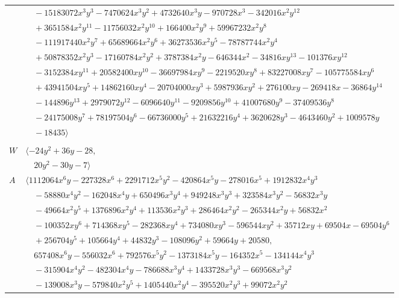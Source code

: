 \documentclass[11pt]{article}
\begin{document}
\begin{longtable}{@{}ll@{}}
 & $\quad -15183072x^{3}y^{3}-7470624x^{3}y^{2}+4732640x^{3}y-970728x^{3}-342016x^{2}y^{12}$\\
 & $\quad +3651584x^{2}y^{11}-11756032x^{2}y^{10}+166400x^{2}y^{9}+59967232x^{2}y^{8}$\\
 & $\quad -111917440x^{2}y^{7}+65689664x^{2}y^{6}+36273536x^{2}y^{5}-78787744x^{2}y^{4}$\\
 & $\quad +50878352x^{2}y^{3}-17160784x^{2}y^{2}+3787384x^{2}y-646344x^{2}-34816xy^{13}-101376xy^{12}$\\
 & $\quad -3152384xy^{11}+20582400xy^{10}-36697984xy^{9}-2219520xy^{8}+83227008xy^{7}-105775584xy^{6}$\\
 & $\quad +43941504xy^{5}+14862160xy^{4}-20704000xy^{3}+5987936xy^{2}+276100xy-269418x-36864y^{14}$\\
 & $\quad -144896y^{13}+2979072y^{12}-6096640y^{11}-9209856y^{10}+41007680y^{9}-37409536y^{8}$\\
 & $\quad -24175008y^{7}+78197504y^{6}-66736000y^{5}+21632216y^{4}+3620628y^{3}-4643460y^{2}+1009578y$\\
 & $\quad -18435\rangle$\\
\addlinespace[2pt]
\multicolumn{2}{@{}p{0.97\textwidth}@{}}{$i=41$, $D_i=4$, $\rho_{ij}$: $4{:}2, \allowbreak 5{:}1, \allowbreak 17{:}2, \allowbreak 18{:}1, \allowbreak 43{:}1, \allowbreak 45{:}1, \allowbreak 49{:}1$}\\
$W$ & $\langle -24y^{2}+36y-28,$\\
 & $\quad 20y^{2}-30y-7\rangle$\\
$A$ & $\langle 1112064x^{6}y-227328x^{6}+2291712x^{5}y^{2}-420864x^{5}y-278016x^{5}+1912832x^{4}y^{3}$\\
 & $\quad -58880x^{4}y^{2}-162048x^{4}y+650496x^{3}y^{4}+949248x^{3}y^{3}+323584x^{3}y^{2}-56832x^{3}y$\\
 & $\quad -49664x^{2}y^{5}+1376896x^{2}y^{4}+113536x^{2}y^{3}+286464x^{2}y^{2}-265344x^{2}y+56832x^{2}$\\
 & $\quad -100352xy^{6}+714368xy^{5}-282368xy^{4}+734080xy^{3}-596544xy^{2}+35712xy+69504x-69504y^{6}$\\
 & $\quad +256704y^{5}+105664y^{4}+44832y^{3}-108096y^{2}+59664y+20580,$\\
 & $\quad 657408x^{6}y-556032x^{6}+792576x^{5}y^{2}-1373184x^{5}y-164352x^{5}-134144x^{4}y^{3}$\\
 & $\quad -315904x^{4}y^{2}-482304x^{4}y-786688x^{3}y^{4}+1433728x^{3}y^{3}-669568x^{3}y^{2}$\\
 & $\quad -139008x^{3}y-579840x^{2}y^{5}+1405440x^{2}y^{4}-395520x^{2}y^{3}+99072x^{2}y^{2}$\\

\end{longtable}
\end{document}
